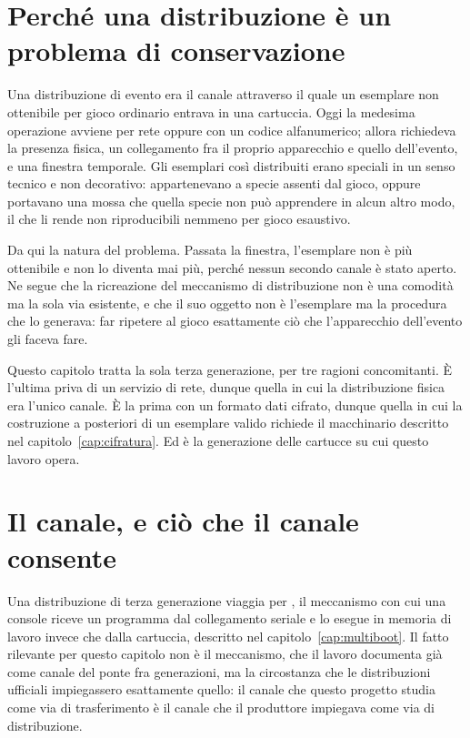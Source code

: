 \section{Perché una distribuzione è un problema di conservazione}

Una distribuzione di evento era il canale attraverso il quale un esemplare non ottenibile per gioco ordinario entrava in una cartuccia. Oggi la medesima operazione avviene per rete oppure con un codice alfanumerico; allora richiedeva la presenza fisica, un collegamento fra il proprio apparecchio e quello dell'evento, e una finestra temporale. Gli esemplari così distribuiti erano speciali in un senso tecnico e non decorativo: appartenevano a specie assenti dal gioco, oppure portavano una mossa che quella specie non può apprendere in alcun altro modo, il che li rende non riproducibili nemmeno per gioco esaustivo.

Da qui la natura del problema. Passata la finestra, l'esemplare non è più ottenibile e non lo diventa mai più, perché nessun secondo canale è stato aperto. Ne segue che la ricreazione del meccanismo di distribuzione non è una comodità ma la sola via esistente, e che il suo oggetto non è l'esemplare ma la procedura che lo generava: far ripetere al gioco esattamente ciò che l'apparecchio dell'evento gli faceva fare.

Questo capitolo tratta la sola terza generazione, per tre ragioni concomitanti. È l'ultima priva di un servizio di rete, dunque quella in cui la distribuzione fisica era l'unico canale. È la prima con un formato dati cifrato, dunque quella in cui la costruzione a posteriori di un esemplare valido richiede il macchinario descritto nel capitolo~\ref{cap:cifratura}. Ed è la generazione delle cartucce su cui questo lavoro opera.

\section{Il canale, e ciò che il canale consente}

Una distribuzione di terza generazione viaggia per , il meccanismo con cui una console riceve un programma dal collegamento seriale e lo esegue in memoria di lavoro invece che dalla cartuccia, descritto nel capitolo~\ref{cap:multiboot}. Il fatto rilevante per questo capitolo non è il meccanismo, che il lavoro documenta già come canale del ponte fra generazioni, ma la circostanza che le distribuzioni ufficiali impiegassero esattamente quello: il canale che questo progetto studia come via di trasferimento è il canale che il produttore impiegava come via di distribuzione.

